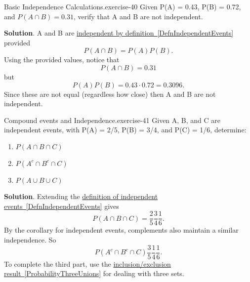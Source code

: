 \documentclass[10pt,]{book}
\numberwithin{equation}{section}
\begin{document}
%
\par
\hypertarget{p-623}{}%
\begin{inlineexercise}{Basic Independence Calculations.}{exercise-40}%
\hypertarget{p-624}{}%
Given P(A) = 0.43, P(B) = 0.72, and \(P(A \cap B) = 0.31\), verify that A and B are not independent.%
\par\smallskip%
\noindent\textbf{Solution}.\hypertarget{solution-18}{}\quad%
\hypertarget{p-625}{}%
A and B are \hyperref[DefnIndependentEvents]{independent by definition~\ref{DefnIndependentEvents}} provided%
\begin{equation*}
P(A \cap B) = P(A) P(B).
\end{equation*}
Using the provided values, notice that%
\begin{equation*}
P(A \cap B) = 0.31
\end{equation*}
but%
\begin{equation*}
P(A)P(B) = 0.43 \cdot 0.72 = 0.3096.
\end{equation*}
Since these are not equal (regardless how close) then A and B are not independent.%
\end{inlineexercise}
%
\par
\hypertarget{p-626}{}%
\begin{inlineexercise}{Compound events and Independence.}{exercise-41}%
\hypertarget{p-627}{}%
Given A, B, and C are independent events, with P(A) = 2/5, P(B) = 3/4, and P(C) = 1/6, determine: \leavevmode%
\begin{enumerate}
\item\hypertarget{li-182}{}\(P(A \cap B \cap C)\)%
\item\hypertarget{li-183}{}\(P(A^c \cap B^c \cap C)\)%
\item\hypertarget{li-184}{}\(P(A \cup B \cup C)\)%
\end{enumerate}
%
\par\smallskip%
\noindent\textbf{Solution}.\hypertarget{solution-19}{}\quad%
\hypertarget{p-628}{}%
Extending the \hyperref[DefnIndependentEvents]{definition of independent events~\ref{DefnIndependentEvents}} gives%
\begin{equation*}
P(A \cap B \cap C) = \frac{2}{5} \frac{3}{4} \frac{1}{6}.
\end{equation*}
By the corollary for independent events, complements also maintain a similar independence. So%
\begin{equation*}
P(A^c \cap B^c \cap C) \frac{3}{5} \frac{1}{4} \frac{1}{6} .
\end{equation*}
To complete the third part, use the \hyperref[ProbabilityThreeUnions]{inclusion/exclusion result~\ref{ProbabilityThreeUnions}} for dealing with three sets.%
\end{inlineexercise}
\end{document}

